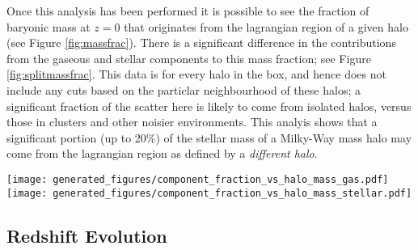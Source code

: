 Once this analysis has been performed it is possible to see the fraction of baryonic mass at $z=0$ that originates from the lagrangian region of a given halo (see Figure \ref{fig:massfrac}). There is a significant difference in the contributions from the gaseous and stellar components to this mass fraction; see Figure \ref{fig:splitmassfrac}. This data is for every halo in the box, and hence does not include any cuts based on the particlar neighbourhood of these halos; a significant fraction of the scatter here is likely to come from isolated halos, versus those in clusters and other noisier environments. This analyis shows that a significant portion (up to 20\%) of the stellar mass of a Milky-Way mass halo may come from the lagrangian region as defined by a \emph{different halo}.


\begin{figure*}
    \centering
    \texttt{[image: generated\_figures/component\_fraction\_vs\_halo\_mass\_gas.pdf]}
    \texttt{[image: generated\_figures/component\_fraction\_vs\_halo\_mass\_stellar.pdf]}
    \caption{Left: fraction of gaseous mass at $z=0$ in each halo from each component; right: fraction of stellar mass at $z=0$ from each component. Note that there is significantly more transfer shown in the gaseous component. Gas that is transferred between lagrangian regions must be given time to cool before being able to form stars. As the events that enable transfer are typically very energetic (AGN, stellar feedback, accretion), it is unlikely that the cooling time will be short enough to form stars by the end of the simulation for most transfer.}
    \label{fig:splitmassfrac}
\end{figure*}

\subsection{Redshift Evolution}


